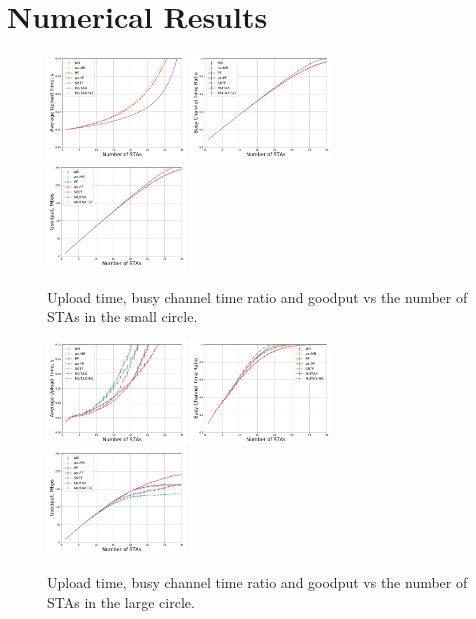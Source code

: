 \section{Numerical Results}
\label{sec:numerical}

\begin{figure}[tb]
	\centering
	\includegraphics[width = 0.329\textwidth]{5-d.pdf}
	\includegraphics[width = 0.329\textwidth]{5-e.pdf}
	\includegraphics[width = 0.329\textwidth]{5-t.pdf}
	\caption{\label{fig:10metres}  Upload time, busy channel time ratio and goodput vs the number of STAs in the small circle.}
\end{figure}

\begin{figure}[bt]
	\centering
	\includegraphics[width = 0.329\textwidth]{20-d.pdf}
	\includegraphics[width = 0.329\textwidth]{20-e.pdf}
	\includegraphics[width = 0.329\textwidth]{20-t.pdf}
	\caption{\label{fig:20metres} Upload time, busy channel time ratio and goodput vs the number of STAs in the large circle.}
\end{figure}

